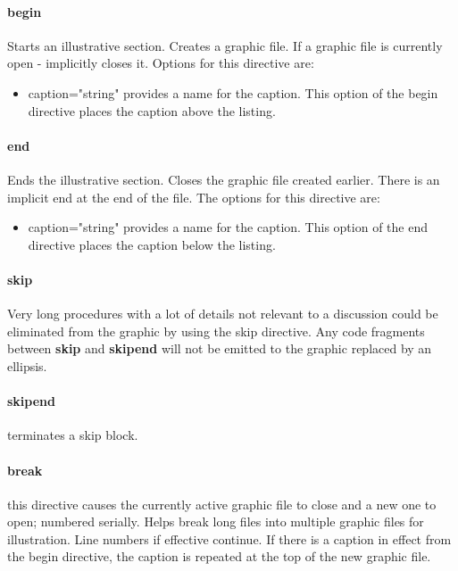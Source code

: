 \documentclass[12pt, a4paper]{article}
\begin{document}
\paragraph{begin} Starts an illustrative section. Creates a graphic file. If a graphic file is currently open - implicitly closes it. Options for this directive are:

\begin{itemize}
    \item caption="string" provides a name for the caption. This option of the begin directive places the caption above the listing.
\end{itemize}

\paragraph{end} Ends the illustrative section. Closes the graphic file created earlier. There is an implicit end at the end of the file. The options for this directive are:
\begin{itemize}
    \item caption="string" provides a name for the caption. This option of the end directive places the caption below the listing.
\end{itemize}

\paragraph{skip} Very long procedures with a lot of details not relevant to a discussion could be eliminated from the graphic by using the skip directive. Any code fragments between \textbf{skip} and \textbf{skipend} will not be emitted to the graphic replaced by an ellipsis.

\paragraph{skipend} terminates a skip block.

\paragraph{break} this directive causes the currently active graphic file to close and a new one to open; numbered serially. Helps break long files into multiple graphic files for illustration. Line numbers if effective continue.
If there is a caption in effect from the begin directive, the caption is repeated at the top of the new graphic file.
\end{document}
